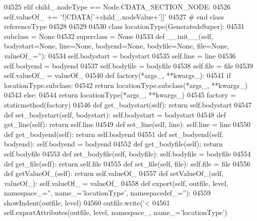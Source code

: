 \begin{DoxyCode}
{{{{{{{{{{{{{{{{{{{{{{{{{{{{{{{{{{{{{{{{{{{{{{{{{{{{{{{{{{{{{{{{{{{{{{{{{{{{{{{{{{{{{{{{{{{{{{{{{{{{{{{{{{{{{{{{{{{{{{{{{{{{{{{{{{{{{{{{{{{{{{{{{{{{{{{{{{{{{{{{{{{{{{{{{{{{{{{{{{{{{{{{{{{{{{{{{{{{{{{{{{{{{{{{{{{{{{{{{{{{{{{{{{{{{{{{{{{{{{{{{{{{{{{{{{{{{{{{{{{{{{{{{{{{{{{{{{{{{{{{{{{{{{{{{{{{{{{{{{{{{{04525         \textcolor{keywordflow}{elif} child\_.nodeType == Node.CDATA\_SECTION\_NODE:
04526             self.valueOf_ += \textcolor{stringliteral}{'![CDATA['}+child\_.nodeValue+\textcolor{stringliteral}{']]'}
04527 \textcolor{comment}{# end class referenceType}
04528 
04529 
04530 \textcolor{keyword}{class }locationType(GeneratedsSuper):
04531     subclass = \textcolor{keywordtype}{None}
04532     superclass = \textcolor{keywordtype}{None}
04533     \textcolor{keyword}{def }__init__(self, bodystart=None, line=None, bodyend=None, bodyfile=None, file=None, valueOf\_=''):
04534         self.bodystart = bodystart
04535         self.line = line
04536         self.bodyend = bodyend
04537         self.bodyfile = bodyfile
04538         self.file = file
04539         self.valueOf_ = valueOf\_
04540     \textcolor{keyword}{def }factory(*args\_, **kwargs\_):
04541         \textcolor{keywordflow}{if} locationType.subclass:
04542             \textcolor{keywordflow}{return} locationType.subclass(*args\_, **kwargs\_)
04543         \textcolor{keywordflow}{else}:
04544             \textcolor{keywordflow}{return} locationType(*args\_, **kwargs\_)
04545     factory = staticmethod(factory)
04546     \textcolor{keyword}{def }get_bodystart(self): \textcolor{keywordflow}{return} self.bodystart
04547     \textcolor{keyword}{def }set_bodystart(self, bodystart): self.bodystart = bodystart
04548     \textcolor{keyword}{def }get_line(self): \textcolor{keywordflow}{return} self.line
04549     \textcolor{keyword}{def }set_line(self, line): self.line = line
04550     \textcolor{keyword}{def }get_bodyend(self): \textcolor{keywordflow}{return} self.bodyend
04551     \textcolor{keyword}{def }set_bodyend(self, bodyend): self.bodyend = bodyend
04552     \textcolor{keyword}{def }get_bodyfile(self): \textcolor{keywordflow}{return} self.bodyfile
04553     \textcolor{keyword}{def }set_bodyfile(self, bodyfile): self.bodyfile = bodyfile
04554     \textcolor{keyword}{def }get_file(self): \textcolor{keywordflow}{return} self.file
04555     \textcolor{keyword}{def }set_file(self, file): self.file = file
04556     \textcolor{keyword}{def }getValueOf_(self): \textcolor{keywordflow}{return} self.valueOf\_
04557     \textcolor{keyword}{def }setValueOf_(self, valueOf\_): self.valueOf\_ = valueOf\_
04558     \textcolor{keyword}{def }export(self, outfile, level, namespace\_='', name\_='locationType', namespacedef\_=''):
04559         showIndent(outfile, level)
04560         outfile.write(\textcolor{stringliteral}{'<%
04561         self.exportAttributes(outfile, level, namespace\_, name\_=\textcolor{stringliteral}{'locationType'})
}}}}}}}}}}}}}}}}}}}}}}}}}}}}}}}}}}}}}}}}}}}}}}}}}}}}}}}}}}}}}}}}}}}}}}}}}}}}}}}}}}}}}}}}}}}}}}}}}}}}}}}}}}}}}}}}}}}}}}}}}}}}}}}}}}}}}}}}}}}}}}}}}}}}}}}}}}}}}}}}}}}}}}}}}}}}}}}}}}}}}}}}}}}}}}}}}}}}}}}}}}}}}}}}}}}}}}}}}}}}}}}}}}}}}}}}}}}}}}}}}}}}}}}}}}}}}}}}}}}}}}}}}}}}}}}}}}}}}}}}}}}}}}}}}}}}}}}}}}}}}}}
\end{DoxyCode}
